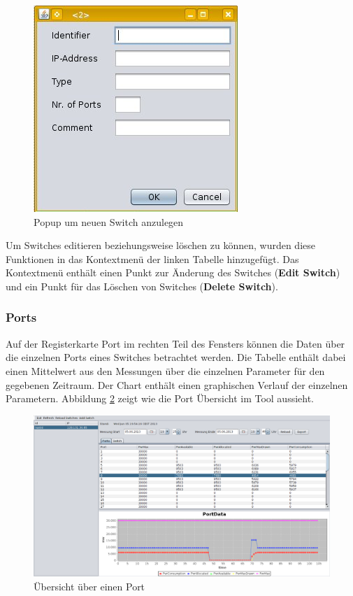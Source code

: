  \begin{figure}[h]
    \centering
    \leavevmode
    \includegraphics[scale=0.5]{figures/screenshot3}
    \caption{Popup um neuen Switch anzulegen}
    \label{fig:popup}
\end{figure}

Um Switches editieren beziehungsweise löschen zu können, wurden diese Funktionen in das Kontextmenü der linken Tabelle hinzugefügt. Das Kontextmenü enthält einen Punkt zur Änderung des Switches (\textbf{Edit Switch}) und ein Punkt für das Löschen von Switches (\textbf{Delete Switch}).

\subsubsection{Ports}
\label{sub:ports}
Auf der Registerkarte Port im rechten Teil des Fensters können die Daten über die einzelnen Ports eines Switches betrachtet werden. Die Tabelle enthält dabei einen Mittelwert aus den Messungen über die einzelnen Parameter für den gegebenen Zeitraum. Der Chart enthält einen graphischen Verlauf der einzelnen Parametern. Abbildung \ref{fig:overview-port} zeigt wie die Port Übersicht im Tool aussieht.

\begin{figure}[h]
    \centering
    \leavevmode
    \includegraphics[width=1.0\linewidth]{figures/portDetails}
    \caption{Übersicht über einen Port}
    \label{fig:overview-port}
\end{figure}

